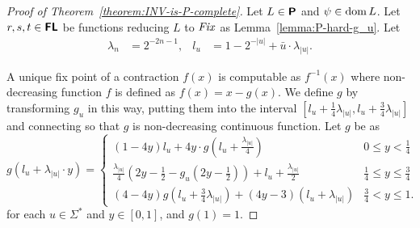 \documentclass[envcountsame,orivec,oribibl]{llncs}
\begin{document}
\begin{proof}
[Proof of Theorem~\ref{theorem:INV-is-P-complete}]
Let $L \in \text{\bfseries \sffamily \upshape P}$ and $\psi \in \mathop{\rm dom} L$.
Let $r, s, t \in \text{\bfseries \sffamily \upshape FL}$ be functions reducing $L$ to $\mathit{Fix}$
as Lemma~\ref{lemma:P-hard-g_u}.
Let
\begin{align}
 \lambda_n &= 2^{-2n-1},
 &
 l_u & = 1 - 2^{-|u|} + \bar u \cdot \lambda_{|u|}.
\end{align}

A unique fix point of a contraction $f(x)$ is computable as
$f^{-1}(x)$ where non-decreasing function $f$ is defined as $f(x) = x - g(x)$.
We define $g$ by transforming $g_u$ in this way, putting them into the
interval $[l_u + \frac{1}{4}\lambda_{|u|}, l_u + \frac{3}{4}\lambda_{|u|}]$
and connecting so that $g$ is non-decreasing continuous function.
Let $g$ be as
\begin{equation}
\label{equation: definition of g}
 g \left( l_u + \lambda_{|u|} \cdot y \right) =
 \begin{cases}
  (1-4y)l_u + 4y \cdot g \left( l_u + \frac{\lambda_{|u|}}{4} \right) 
  &
  0 \le y < \frac 1 4
  \\
  \frac{\lambda_{|u|}}{4} \left( 2y - \frac 1 2 - g_u \left( 2y - \frac 1 2 \right) \right) + l_u + \frac{\lambda_{|u|}}{2}
  &
  \frac 1 4 \le y \le \frac 3 4
  \\
  (4-4y) g \left( l_u + \frac 3 4 \lambda_{|u|} \right) + (4y-3)(l_u + \lambda_{|u|})
  &
  \frac 3 4 < y \le 1.
 \end{cases}
\end{equation}
for each $u \in \Sigma^*$ and $y \in [0,1]$, and $g(1) = 1$.


\end{proof}
\end{document}
